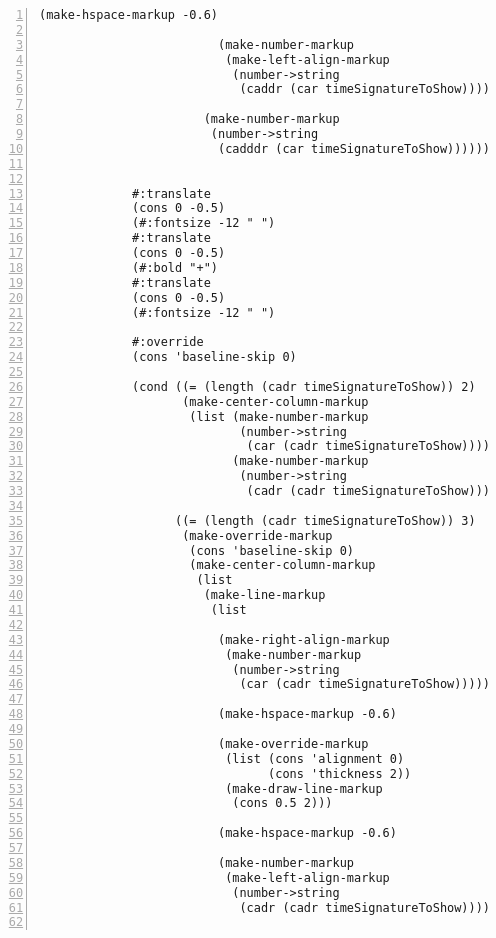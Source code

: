 \begin{Verbatim}[numbers=left,xleftmargin=5mm]
                         (make-hspace-markup -0.6)

                         (make-number-markup
                          (make-left-align-markup
                           (number->string
                            (caddr (car timeSignatureToShow)))))))

                       (make-number-markup
                        (number->string
                         (cadddr (car timeSignatureToShow)))))))))


             #:translate
             (cons 0 -0.5)
             (#:fontsize -12 " ")
             #:translate
             (cons 0 -0.5)
             (#:bold "+")
             #:translate
             (cons 0 -0.5)
             (#:fontsize -12 " ")

             #:override
             (cons 'baseline-skip 0)

             (cond ((= (length (cadr timeSignatureToShow)) 2)
                    (make-center-column-markup
                     (list (make-number-markup
                            (number->string
                             (car (cadr timeSignatureToShow))))
                           (make-number-markup
                            (number->string
                             (cadr (cadr timeSignatureToShow)))))))

                   ((= (length (cadr timeSignatureToShow)) 3)
                    (make-override-markup
                     (cons 'baseline-skip 0)
                     (make-center-column-markup
                      (list
                       (make-line-markup
                        (list

                         (make-right-align-markup
                          (make-number-markup
                           (number->string
                            (car (cadr timeSignatureToShow)))))

                         (make-hspace-markup -0.6)

                         (make-override-markup
                          (list (cons 'alignment 0)
                                (cons 'thickness 2))
                          (make-draw-line-markup
                           (cons 0.5 2)))

                         (make-hspace-markup -0.6)

                         (make-number-markup
                          (make-left-align-markup
                           (number->string
                            (cadr (cadr timeSignatureToShow)))))))


\end{Verbatim}
